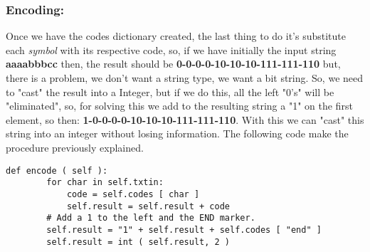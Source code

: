 \subsubsection{Encoding:}

Once we have the codes dictionary created, the last thing to do it's substitute each {\itshape symbol} with its respective code, so, if we have initially the input string {\bfseries aaaabbbcc} then, the result should be {\bfseries 0-0-0-0-10-10-10-111-111-110} but, there is a problem, we don't want a string type, we want a bit string. So, we need to "cast" the result into a Integer, but if we do this, all the left "0's" will be "eliminated", so, for solving this we add to the resulting string a "1" on the first element, so then: {\bfseries 1-0-0-0-0-10-10-10-111-111-110}. With this we can "cast" this string into an integer without losing information. The following code make the procedure previously explained. \hfill \break

\begin{lstlisting}
def encode ( self ):
        for char in self.txtin:
            code = self.codes [ char ]
            self.result = self.result + code
        # Add a 1 to the left and the END marker.
        self.result = "1" + self.result + self.codes [ "end" ]
        self.result = int ( self.result, 2 )
\end{lstlisting}